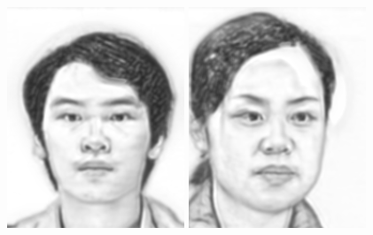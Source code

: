 \documentclass[10pt,twocolumn,letterpaper]{article}
\begin{document}
\begin{figure}[htbp]
{\begin{minipage}[b]{0.22\linewidth}
\includegraphics[width=0.99\linewidth]{img/light&pose_invariance/bfcn_l2.png}
\includegraphics[width=0.99\linewidth]{img/light&pose_invariance/bfcn_p1.png}

\end{minipage}}
\end{figure}
\end{document}

